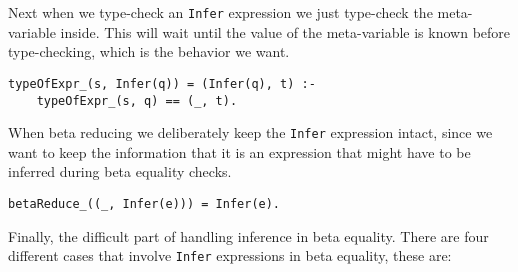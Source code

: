 Next when we type-check an \verb|Infer| expression we just type-check the meta-variable inside. This will wait until the value of the meta-variable is known before type-checking, which is the behavior we want.
\begin{lstlisting}
typeOfExpr_(s, Infer(q)) = (Infer(q), t) :-
	typeOfExpr_(s, q) == (_, t).
\end{lstlisting}

When beta reducing we deliberately keep the \verb|Infer| expression intact, since we want to keep the information that it is an expression that might have to be inferred during beta equality checks.
\begin{lstlisting}
betaReduce_((_, Infer(e))) = Infer(e).
\end{lstlisting}

Finally, the difficult part of handling inference in beta equality. There are four different cases that involve \verb|Infer| expressions in beta equality, these are:

